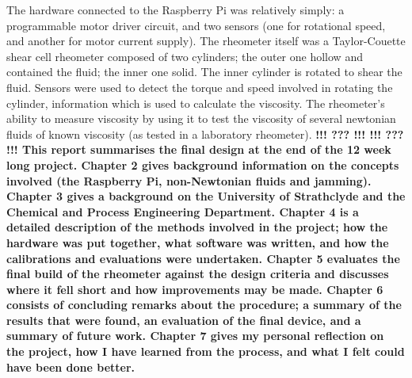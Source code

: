 \documentclass[twoside,a4]{report}
\def\br{\newline \newline \noindent}
\def\cbh{\large\bfseries !!! ??? !!! \normalsize\normalfont}
\begin{document}
	The hardware connected to the Raspberry Pi was relatively simply: a programmable motor driver circuit, and two sensors (one for rotational speed, and another for motor current supply).\br
	The rheometer itself was a Taylor-Couette shear cell rheometer composed of two cylinders; the outer one hollow and contained the fluid; the inner one solid. The inner cylinder is rotated to shear the fluid. Sensors were used to detect the torque and speed involved in rotating the cylinder, information which is used to calculate the viscosity.\br
	The rheometer's ability to measure viscosity by using it to test the viscosity of several newtonian fluids of known viscosity (as tested in a laboratory rheometer). \cbh
	\br
	\cbh \br This report summarises the final design at the end of the 12 week long project. Chapter 2 gives background information on the concepts involved (the Raspberry Pi, non-Newtonian fluids and jamming). Chapter 3 gives a background on the University of Strathclyde and the Chemical and Process Engineering Department. Chapter 4 is a detailed description of the methods involved in the project; how the hardware was put together, what software was written, and how the calibrations and evaluations were undertaken. Chapter 5 evaluates the final build of the rheometer against the design criteria and discusses where it fell short and how improvements may be made. Chapter 6 consists of concluding remarks about the procedure; a summary of the results that were found, an evaluation of the final device, and a summary of future work. Chapter 7 gives my personal reflection on the project, how I have learned from the process, and what I felt could have been done better.
	
\end{document}
